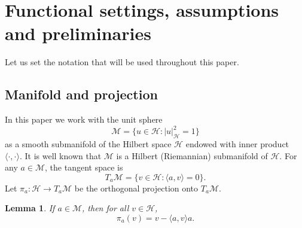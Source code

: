 \documentclass[10pt,a4paper]{amsart}
\numberwithin{equation}{section}
\newtheorem{lemma}[theorem]{Lemma}
\begin{document}
\section{Functional settings, assumptions and preliminaries}
Let us set the notation that will be used throughout this paper.

\subsection{Manifold and projection}

In this paper we work with the unit sphere
\[
\mathcal{M} = \{ u \in \mathcal{H} : |u|_{\mathcal{H}}^{2} = 1\}
\]
as a smooth submanifold of the Hilbert space $\mathcal{H}$ endowed with inner product
$\langle\cdot,\cdot\rangle$. It is well known that $\mathcal{M}$ is a Hilbert
(Riemannian) submanifold of $\mathcal{H}$. For any $a \in \mathcal{M}$, the tangent
space is
\[
T_{a}\mathcal{M} = \{ v \in \mathcal{H} : \langle a, v \rangle = 0 \}.
\]
Let $\pi_{a} : \mathcal{H} \longrightarrow T_{a}\mathcal{M}$
be the orthogonal projection onto $T_a\mathcal{M}$.

\begin{lemma}
\label{lem-orthogonal projection}
If $a \in \mathcal{M}$, then for all $v \in \mathcal{H}$,
\[
\pi_{a}(v) = v - \langle a, v \rangle a.
\]
\end{lemma}
\end{document}
